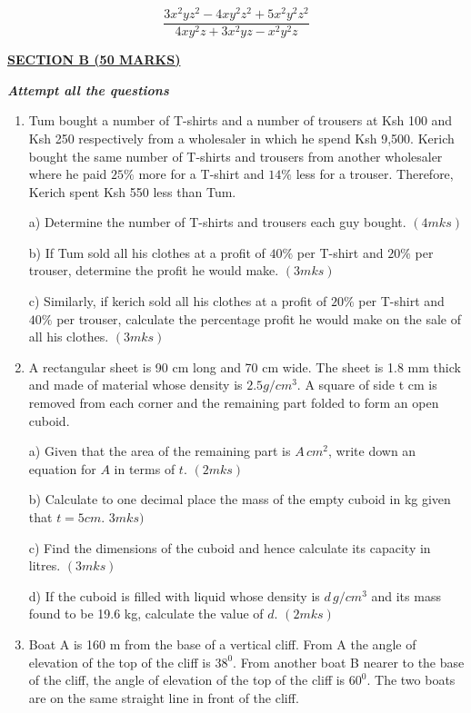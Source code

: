 \documentclass[
  a4paperpaper,
]{scrbook}
\begin{document}
\begin{tcolorbox}
\[\frac{3x^2yz^2-4xy^2z^2+5x^2y^2z^2}{4xy^2z+3x^2yz-x^2y^2z}\]

\ul{\textbf{SECTION B (50 MARKS)}}

\textbf{\emph{Attempt all the questions}}

\begin{enumerate}
\def\labelenumi{\arabic{enumi}.}
\setcounter{enumi}{16}
\item
  Tum bought a number of T-shirts and a number of trousers at Ksh 100
  and Ksh 250 respectively from a wholesaler in which he spend Ksh
  9,500. Kerich bought the same number of T-shirts and trousers from
  another wholesaler where he paid \(25\%\) more for a T-shirt and
  \(14\%\) less for a trouser. Therefore, Kerich spent Ksh 550 less than
  Tum.

  a) Determine the number of T-shirts and trousers each guy bought.
  \((4mks)\)

  b) If Tum sold all his clothes at a profit of \(40\%\) per T-shirt and
  \(20\%\) per trouser, determine the profit he would make. \((3mks)\)

  c) Similarly, if kerich sold all his clothes at a profit of \(20\%\)
  per T-shirt and \(40\%\) per trouser, calculate the percentage profit
  he would make on the sale of all his clothes. \((3mks)\)
\item
  A rectangular sheet is 90 cm long and 70 cm wide. The sheet is 1.8 mm
  thick and made of material whose density is \(2.5g/cm^3\). A square of
  side t cm is removed from each corner and the remaining part folded to
  form an open cuboid.

  a) Given that the area of the remaining part is \(A \,cm^2\), write
  down an equation for \(A\) in terms of \(t\). \((2mks)\)

  b) Calculate to one decimal place the mass of the empty cuboid in kg
  given that \(t= 5cm\). \(3mks)\)

  c) Find the dimensions of the cuboid and hence calculate its capacity
  in litres. \((3mks)\)

  d) If the cuboid is filled with liquid whose density is \(d\, g/cm^3\)
  and its mass found to be 19.6 kg, calculate the value of \(d\).
  \((2mks)\)
\item
  Boat A is 160 m from the base of a vertical cliff. From A the angle of
  elevation of the top of the cliff is \(38^0\). From another boat B
  nearer to the base of the cliff, the angle of elevation of the top of
  the cliff is \(60^0\). The two boats are on the same straight line in
  front of the cliff.


\end{enumerate}
\end{tcolorbox}
\end{document}
